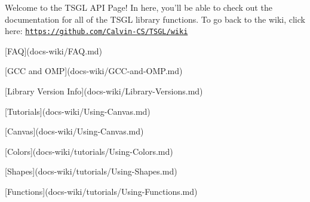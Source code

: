 \-Welcome to the \-T\-S\-G\-L \-A\-P\-I \-Page! \-In here, you'll be able to check out the documentation for all of the \-T\-S\-G\-L library functions. \-To go back to the wiki, click here\-: \href{https://github.com/Calvin-CS/TSGL/wiki}{\tt https\-://github.\-com/\-Calvin-\/\-C\-S/\-T\-S\-G\-L/wiki}
\begin{DoxyItemize}
\item \mbox{[}\-F\-A\-Q\mbox{]}(docs-\/wiki/\-F\-A\-Q.\-md)
\item \mbox{[}\-G\-C\-C and \-O\-M\-P\mbox{]}(docs-\/wiki/\-G\-C\-C-\/and-\/\-O\-M\-P.\-md)
\item \mbox{[}\-Library \-Version \-Info\mbox{]}(docs-\/wiki/\-Library-\/\-Versions.\-md)
\item \mbox{[}\-Tutorials\mbox{]}(docs-\/wiki/\-Using-\/\-Canvas.\-md)
\begin{DoxyItemize}
\item \mbox{[}\-Canvas\mbox{]}(docs-\/wiki/\-Using-\/\-Canvas.\-md)
\item \mbox{[}\-Colors\mbox{]}(docs-\/wiki/tutorials/\-Using-\/\-Colors.\-md)
\item \mbox{[}\-Shapes\mbox{]}(docs-\/wiki/tutorials/\-Using-\/\-Shapes.\-md)
\item \mbox{[}\-Functions\mbox{]}(docs-\/wiki/tutorials/\-Using-\/\-Functions.\-md)
\end{DoxyItemize}
\end{DoxyItemize}
